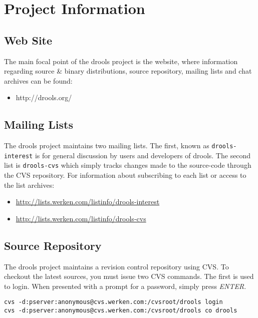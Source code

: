 \chapter{Project Information}


\section{Web Site}

The main focal point of the drools project is the website, where
information regarding source \& binary distributions, source
repository, mailing lists and chat archives can be found:

\begin{itemize}
    \item http://drools.org/
\end{itemize}

\section{Mailing Lists}

The drools project maintains two mailing lists.  The first, known as
\verb|drools-interest| is for general discussion by users and
developers of drools.  The second list is \verb|drools-cvs| which
simply tracks changes made to the source-code through the CVS
repository. For information about subscribing to each list or access 
to the list archives:

\begin{itemize}
    \item \url{http://lists.werken.com/listinfo/drools-interest}
    \item \url{http://lists.werken.com/listinfo/drools-cvs}
\end{itemize}

\section{Source Repository}

The drools project maintains a revision control repository using
CVS.  To checkout the latest sources, you must issue two CVS commands.
The first is used to login.  When presented with a prompt for a
password, simply press \emph{ENTER}.

\begin{verbatim}
cvs -d:pserver:anonymous@cvs.werken.com:/cvsroot/drools login
cvs -d:pserver:anonymous@cvs.werken.com:/cvsroot/drools co drools
\end{verbatim}

